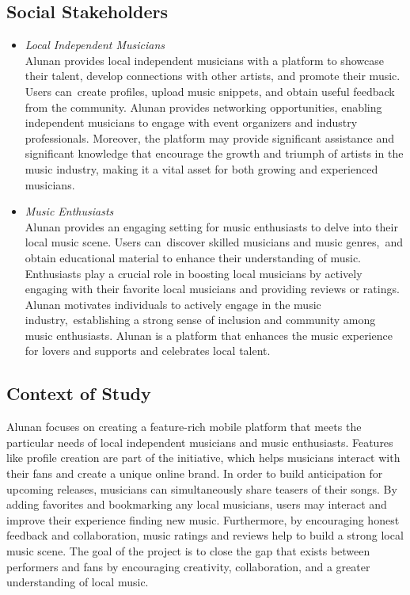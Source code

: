 \subsection{Social Stakeholders}
\begin{itemize}
    \item \textit{Local Independent Musicians}\\
    Alunan provides local independent musicians with a platform to showcase their talent, develop connections with other artists, and promote their music. Users can create profiles, upload music snippets, and obtain useful feedback from the community. Alunan provides networking opportunities, enabling independent musicians to engage with event organizers and industry professionals. Moreover, the platform may provide significant assistance and significant knowledge that encourage the growth and triumph of artists in the music industry, making it a vital asset for both growing and experienced musicians.
    \item \textit{Music Enthusiasts}\\
    Alunan provides an engaging setting for music enthusiasts to delve into their local music scene. Users can discover skilled musicians and music genres, and obtain educational material to enhance their understanding of music. Enthusiasts play a crucial role in boosting local musicians by actively engaging with their favorite local musicians and providing reviews or ratings. Alunan motivates individuals to actively engage in the music industry, establishing a strong sense of inclusion and community among music enthusiasts. Alunan is a platform that enhances the music experience for lovers and supports and celebrates local talent.
\end{itemize}

\subsection{Context of Study}
Alunan focuses on creating a feature-rich mobile platform that meets the particular needs of local independent musicians and music enthusiasts. Features like profile creation are part of the initiative, which helps musicians interact with their fans and create a unique online brand. In order to build anticipation for upcoming releases, musicians can simultaneously share teasers of their songs. By adding favorites and bookmarking any local musicians, users may interact and improve their experience finding new music. Furthermore, by encouraging honest feedback and collaboration, music ratings and reviews help to build a strong local music scene. The goal of the project is to close the gap that exists between performers and fans by encouraging creativity, collaboration, and a greater understanding of local music. \\

